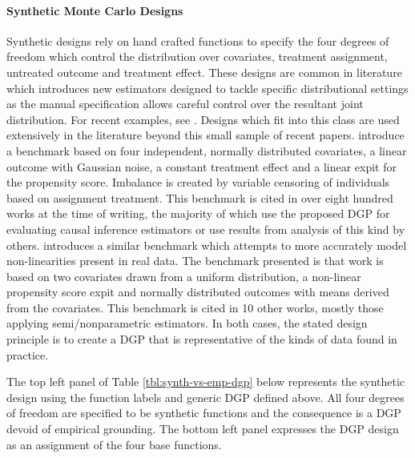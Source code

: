 \documentclass[../main.tex]{subfiles}
\begin{document}
\vspace{\baselineskip}
\paragraph*{Synthetic Monte Carlo Designs}\par


\vspace{\baselineskip}
Synthetic designs rely on hand crafted functions to specify the four degrees of freedom which control the distribution over covariates, treatment assignment, untreated outcome and treatment effect. These designs are common in literature which introduces new estimators designed to tackle specific distributional settings as the manual specification allows careful control over the resultant joint distribution. For recent examples, see \textcite{Kunzel2018TransferNetworks, Johansson2018LearningDesigns, Johansson2016LearningInference}. Designs which fit into this class are used extensively in the literature beyond this small sample of recent papers. \textcite{Kang2007Demystifying1} introduce a benchmark based on four independent, normally distributed covariates, a linear outcome with Gaussian noise, a constant treatment effect and a linear expit for the propensity score. Imbalance is created by variable censoring of individuals based on assignment treatment. This benchmark is cited in over eight hundred works at the time of writing, the majority of which use the proposed DGP for evaluating causal inference estimators or use results from analysis of this kind by others. \textcite{Kallus2016AInference} introduces a similar benchmark which attempts to more accurately model non-linearities present in real data. The benchmark presented is that work is based on two covariates drawn from a uniform distribution, a non-linear propensity score expit and normally distributed outcomes with means derived from the covariates. This benchmark is cited in 10 other works, mostly those applying semi/nonparametric estimators. In both cases, the stated design principle is to create a DGP that is representative of the kinds of data found in practice.\par


\vspace{\baselineskip}
The top left panel of Table \ref{tbl:synth-vs-emp-dgp} below represents the synthetic design using the function labels and generic DGP defined above. All four degrees of freedom are specified to be synthetic functions and the consequence is a DGP devoid of empirical grounding. The bottom left panel expresses the \textcite{Kang2007DemystifyingData} DGP design as an assignment of the four base functions.\par
\end{document}
